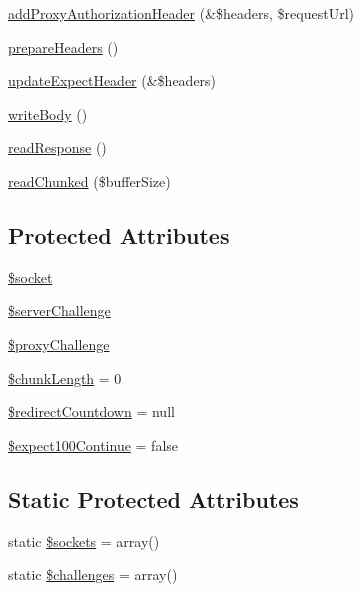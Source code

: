 \begin{DoxyCompactItemize}
\hyperlink{classHTTP__Request2__Adapter__Socket_a65649f201171f34f2db163033fbfde27}{add\-Proxy\-Authorization\-Header} (\&\$headers, \$request\-Url)
\item 
\hyperlink{classHTTP__Request2__Adapter__Socket_a8715074a6226005aa4db694a899c759b}{prepare\-Headers} ()
\item 
\hyperlink{classHTTP__Request2__Adapter__Socket_a7a547941e41ce97677f3217284a0c447}{update\-Expect\-Header} (\&\$headers)
\item 
\hyperlink{classHTTP__Request2__Adapter__Socket_a091decf5cd08db3d422e3d50dafa4122}{write\-Body} ()
\item 
\hyperlink{classHTTP__Request2__Adapter__Socket_ace322a437e3d44b48bd44c2d452e0ad0}{read\-Response} ()
\item 
\hyperlink{classHTTP__Request2__Adapter__Socket_a2a5a784d7631133a5713476ee96c62ed}{read\-Chunked} (\$buffer\-Size)
\end{DoxyCompactItemize}
\subsection*{Protected Attributes}
\begin{DoxyCompactItemize}
\item 
\hyperlink{classHTTP__Request2__Adapter__Socket_ad9f67426c07302e3867c01577fffc27b}{\$socket}
\item 
\hyperlink{classHTTP__Request2__Adapter__Socket_a39896645b7671bfc2af02c5db7853341}{\$server\-Challenge}
\item 
\hyperlink{classHTTP__Request2__Adapter__Socket_a0b3a0d18548e354e248253f67e1d5f50}{\$proxy\-Challenge}
\item 
\hyperlink{classHTTP__Request2__Adapter__Socket_add96406caddf7540cc0525dee2aa479f}{\$chunk\-Length} = 0
\item 
\hyperlink{classHTTP__Request2__Adapter__Socket_a667d94f4db2e719a1c17809a3ff3d355}{\$redirect\-Countdown} = null
\item 
\hyperlink{classHTTP__Request2__Adapter__Socket_afd2a8a4a59755ae2fb901741774cb02c}{\$expect100\-Continue} = false
\end{DoxyCompactItemize}
\subsection*{Static Protected Attributes}
\begin{DoxyCompactItemize}
\item 
static \hyperlink{classHTTP__Request2__Adapter__Socket_ac7d848682d9289b2c270abb214338455}{\$sockets} = array()
\item 
static \hyperlink{classHTTP__Request2__Adapter__Socket_ae4456b3dff588030e66270e99d29e589}{\$challenges} = array()
\end{DoxyCompactItemize}


